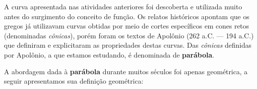 \label{\detokenize{AF209-6:sec-funcao-quadratica-org-ideias-transformacoes}}\label{\detokenize{AF209-6::doc}}\label{\detokenize{AF209-6:organizando-as-ideias-os-parametros-da-forma-canonica-e-o-grafico-da-funcao-quadratica}}
A curva apresentada nas atividades anteriores foi descoberta e utilizada muito antes do surgimento do conceito de função. Os relatos históricos apontam que os gregos já utilizavam curvas obtidas por meio de cortes específicos em cones retos (denominadas \textit{cônicas}), porém foram os textos de Apolônio (262 a.C. — 194 a.C.) que definiram e explicitaram as propriedades destas curvas. Das \textit{cônicas}
definidas por Apolônio, a que estamos estudando, é denominada de \textbf{parábola}.

A abordagem dada à \textbf{parábola} durante muitos séculos foi apenas geométrica, a seguir apresentamos sua definição geométrica:

